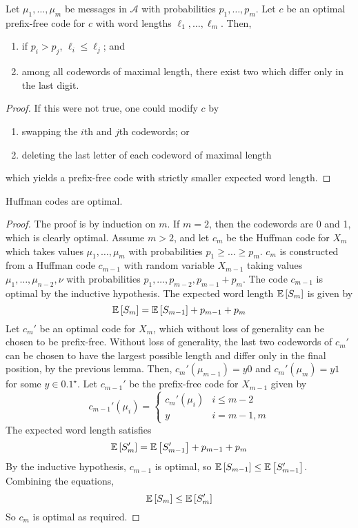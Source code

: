 \begin{lemma}
    Let $\mu_1, \dots, \mu_m$ be messages in $\mathcal A$ with probabilities $p_1, \dots, p_m$.
    Let $c$ be an optimal prefix-free code for $c$ with word lengths $\ell_1, \dots, \ell_m$.
    Then,
    \begin{enumerate}
        \item if $p_i > p_j$, $\ell_i \leq \ell_j$; and
        \item among all codewords of maximal length, there exist two which differ only in the last digit.
    \end{enumerate}
\end{lemma}
\begin{proof}
    If this were not true, one could modify $c$ by
    \begin{enumerate}
        \item swapping the $i$th and $j$th codewords; or
        \item deleting the last letter of each codeword of maximal length
    \end{enumerate}
    which yields a prefix-free code with strictly smaller expected word length.
\end{proof}
\begin{theorem}
    Huffman codes are optimal.
\end{theorem}
\begin{proof}
    The proof is by induction on $m$.
    If $m = 2$, then the codewords are 0 and 1, which is clearly optimal.
    Assume $m > 2$, and let $c_m$ be the Huffman code for $X_m$ which takes values $\mu_1, \dots, \mu_m$ with probabilities $p_1 \geq \dots \geq p_m$.
    $c_m$ is constructed from a Huffman code $c_{m-1}$ with random variable $X_{m-1}$ taking values $\mu_1, \dots, \mu_{n-2}, \nu$ with probabilities $p_1, \dots, p_{m-2}, p_{m-1} + p_m$.
    The code $c_{m-1}$ is optimal by the inductive hypothesis.
    The expected word length $\mathbb{E}\left[{S_m}\right]$ is given by
    \[ \mathbb{E}\left[{S_m}\right] = \mathbb{E}\left[{S_{m-1}}\right] + p_{m-1} + p_m \]
    Let $c_m'$ be an optimal code for $X_m$, which without loss of generality can be chosen to be prefix-free.
    Without loss of generality, the last two codewords of $c_m'$ can be chosen to have the largest possible length and differ only in the final position, by the previous lemma.
    Then, $c_m'(\mu_{m-1}) = y 0$ and $c_m'(\mu_m) = y 1$ for some $y \in \qty{0,1}^\star$.
    Let $c_{m-1}'$ be the prefix-free code for $X_{m-1}$ given by
    \[ c_{m-1}'(\mu_i) = \begin{cases}
        c_m'(\mu_i) & i \leq m-2 \\
        y & i = m-1, m
    \end{cases} \]
    The expected word length satisfies
    \[ \mathbb{E}\left[{S_m'}\right] = \mathbb{E}\left[{S_{m-1}'}\right] + p_{m-1} + p_m \]
    By the inductive hypothesis, $c_{m-1}$ is optimal, so $\mathbb{E}\left[{S_{m-1}}\right] \leq \mathbb{E}\left[{S_{m-1}'}\right]$.
    Combining the equations,
    \[ \mathbb{E}\left[{S_m}\right] \leq \mathbb{E}\left[{S_m'}\right] \]
    So $c_m$ is optimal as required.
\end{proof}
